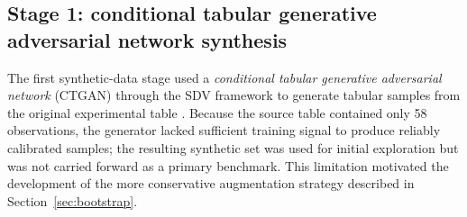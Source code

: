 \documentclass[11pt]{article}
\begin{document}
\subsection{Stage 1: conditional tabular generative adversarial network synthesis}
The first synthetic-data stage used a \textit{conditional tabular generative adversarial network} (CTGAN) through the SDV framework to generate tabular samples from the original experimental table \cite{xu2019}. Because the source table contained only 58 observations, the generator lacked sufficient training signal to produce reliably calibrated samples; the resulting synthetic set was used for initial exploration but was not carried forward as a primary benchmark. This limitation motivated the development of the more conservative augmentation strategy described in Section~\ref{sec:bootstrap}.
\end{document}

